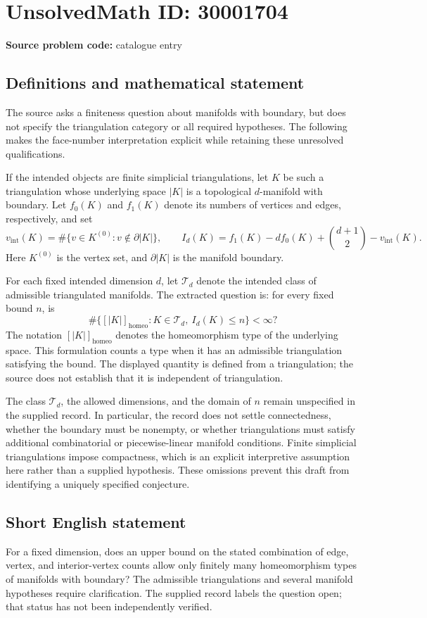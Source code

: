 \documentclass[11pt]{article}
\begin{document}
\section*{UnsolvedMath ID: 30001704}
\textbf{Source problem code:} catalogue entry
\subsection{Definitions and mathematical statement}
The source asks a finiteness question about manifolds with boundary, but does not specify the triangulation category or all required hypotheses. The following makes the face-number interpretation explicit while retaining these unresolved qualifications.

If the intended objects are finite simplicial triangulations, let \(K\) be such a triangulation whose underlying space \(|K|\) is a topological \(d\)-manifold with boundary. Let \(f_0(K)\) and \(f_1(K)\) denote its numbers of vertices and edges, respectively, and set
\[
 v_{\mathrm{int}}(K)=\#\{v\in K^{(0)}:v\notin\partial|K|\},
 \qquad
 I_d(K)=f_1(K)-d f_0(K)+\binom{d+1}{2}-v_{\mathrm{int}}(K).
\]
Here \(K^{(0)}\) is the vertex set, and \(\partial|K|\) is the manifold boundary.

For each fixed intended dimension \(d\), let \(\mathcal T_d\) denote the intended class of admissible triangulated manifolds. The extracted question is: for every fixed bound \(n\), is
\[
 \#\bigl\{[|K|]_{\mathrm{homeo}}:
 K\in\mathcal T_d,\ I_d(K)\le n\bigr\}<\infty?
\]
The notation \([|K|]_{\mathrm{homeo}}\) denotes the homeomorphism type of the underlying space. This formulation counts a type when it has an admissible triangulation satisfying the bound. The displayed quantity is defined from a triangulation; the source does not establish that it is independent of triangulation.

The class \(\mathcal T_d\), the allowed dimensions, and the domain of \(n\) remain unspecified in the supplied record. In particular, the record does not settle connectedness, whether the boundary must be nonempty, or whether triangulations must satisfy additional combinatorial or piecewise-linear manifold conditions. Finite simplicial triangulations impose compactness, which is an explicit interpretive assumption here rather than a supplied hypothesis. These omissions prevent this draft from identifying a uniquely specified conjecture.
\subsection{Short English statement}
For a fixed dimension, does an upper bound on the stated combination of edge, vertex, and interior-vertex counts allow only finitely many homeomorphism types of manifolds with boundary? The admissible triangulations and several manifold hypotheses require clarification. The supplied record labels the question open; that status has not been independently verified.
\end{document}
